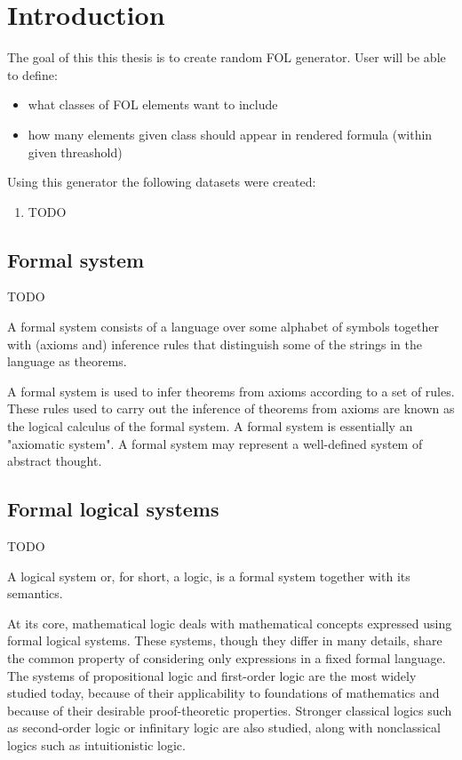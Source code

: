 \chapter{Introduction}

The goal of this this thesis is to create random \gls{FOL} generator. User will be able to define:
\begin{itemize}
\item what classes of \gls{FOL} elements want to include
\item how many elements given class should appear in rendered formula (within given threashold)
\end{itemize}

Using this generator the following datasets were created:
\begin{enumerate}
  \item TODO
\end{enumerate}

\section{Formal system}
TODO

A formal system consists of a language over some alphabet of symbols together with (axioms and) inference rules that distinguish some of the strings in the language as theorems.

A formal system is used to infer theorems from axioms according to a set of rules. These rules used to carry out the inference of theorems from axioms are known as the logical calculus of the formal system. A formal system is essentially an "axiomatic system". A formal system may represent a well-defined system of abstract thought.

\section{Formal logical systems}

TODO 

A logical system or, for short, a logic, is a formal system together with its semantics.

At its core, mathematical logic deals with mathematical concepts expressed using formal logical systems. These systems, though they differ in many details, share the common property of considering only expressions in a fixed formal language. The systems of propositional logic and first-order logic are the most widely studied today, because of their applicability to foundations of mathematics and because of their desirable proof-theoretic properties. Stronger classical logics such as second-order logic or infinitary logic are also studied, along with nonclassical logics such as intuitionistic logic. 

